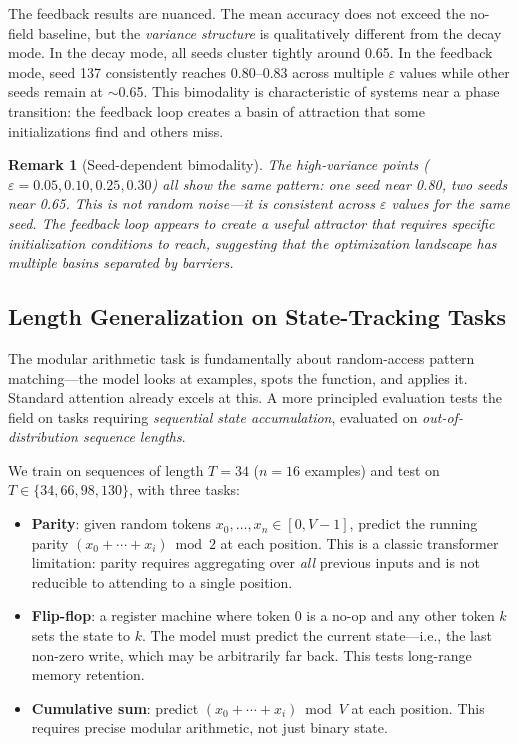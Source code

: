 \documentclass[11pt,a4paper]{article}
\newtheorem{remark}{Remark}
\newcommand{\evap}{\varepsilon}
\begin{document}
The feedback results are nuanced. The mean accuracy does not exceed
the no-field baseline, but the \emph{variance structure} is qualitatively
different from the decay mode. In the decay mode, all seeds cluster
tightly around 0.65. In the feedback mode, seed 137 consistently reaches
0.80--0.83 across multiple $\evap$ values while other seeds remain at
$\sim$0.65. This bimodality is characteristic of systems near a phase
transition: the feedback loop creates a basin of attraction that some
initializations find and others miss.

\begin{remark}[Seed-dependent bimodality]
The high-variance points ($\evap = 0.05, 0.10, 0.25, 0.30$) all show
the same pattern: one seed near 0.80, two seeds near 0.65. This is
not random noise---it is consistent across $\evap$ values for the same
seed. The feedback loop appears to create a useful attractor that
requires specific initialization conditions to reach, suggesting that
the optimization landscape has multiple basins separated by barriers.
\end{remark}

\subsection{Length Generalization on State-Tracking Tasks}
\label{sec:lengthgen}

The modular arithmetic task is fundamentally about random-access
pattern matching---the model looks at examples, spots the function, and
applies it. Standard attention already excels at this. A more principled
evaluation tests the field on tasks requiring \emph{sequential state
accumulation}, evaluated on \emph{out-of-distribution sequence lengths}.

We train on sequences of length $T = 34$ ($n = 16$ examples) and test
on $T \in \{34, 66, 98, 130\}$, with three tasks:

\begin{itemize}
    \item \textbf{Parity}: given random tokens $x_0, \ldots, x_n \in
          [0, V\!-\!1]$, predict the running parity
          $(x_0 + \cdots + x_i) \bmod 2$ at each position. This is a
          classic transformer limitation: parity requires aggregating
          over \emph{all} previous inputs and is not reducible to
          attending to a single position.
    \item \textbf{Flip-flop}: a register machine where token $0$ is
          a no-op and any other token $k$ sets the state to $k$. The
          model must predict the current state---i.e., the last non-zero
          write, which may be arbitrarily far back. This tests
          long-range memory retention.
    \item \textbf{Cumulative sum}: predict $(x_0 + \cdots + x_i)
          \bmod V$ at each position. This requires precise modular
          arithmetic, not just binary state.
\end{itemize}
\end{document}
